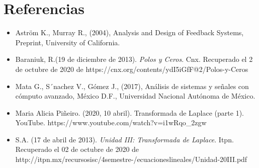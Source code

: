 \section*{Referencias}

\begin{itemize}
	\item Aström K., Murray R., (2004), Analysis and Design of Feedback Systems, Preprint, University of California.
	\item Baraniuk, R.(19 de diciembre de 2013).\textit{ Polos y Ceros}. Cnx. Recuperado el 2 de octubre de 2020 de
	\subitem https://cnx.org/contents/ydI5iGfF@2/Polos-y-Ceros	
	\item Mata G., S´nachez V., Gómez J., (2017), Análisis de sistemas y señales con cómputo avanzado, México D.F., Universidad Nacional Autónoma de México.
	\item Maria Alicia Piñeiro. (2020, 10 abril). Transformada de Laplace (parte 1). YouTube. 
	\subitem https://www.youtube.com/watch?v=i1wRqo\_2zgw
	
	\item	S.A. (17 de abril de 2013).\textit{ Unidad III: Transformada de Laplace}. Itpn. Recuperado el 02 de octubre de 2020 de http://itpn.mx/recursosisc/4semestre-/ecuacioneslineales/Unidad-20III.pdf
\end{itemize}